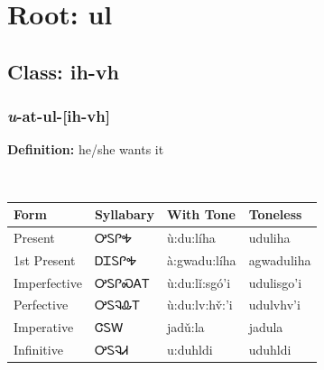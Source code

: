 \needspace{4in}
\section*{Root: ul}
\nopagebreak
{}
\needspace{3in}
\subsection*{Class: ih-vh}
\nopagebreak
\needspace{2in}
\subsubsection*{\textit{u}{-}at{-}\textbf{ul}{-}[ih-vh]}
\nopagebreak
\textbf{Definition: } he/she wants it
\\[0.5em]
\begin{tabularx}{\textwidth}{l X X X}%
\toprule%
\textbf{Form}&\textbf{Syllabary}&\textbf{With Tone}&\textbf{Toneless}\\%
\midrule%
Present&ᎤᏚᎵᎭ&ù:du:líha&uduliha\\%
1st Present&ᎠᏆᏚᎵᎭ&à:gwadu:líha&agwaduliha\\%
Imperfective&ᎤᏚᎵᏍᎪᎢ&ù:du:lǐ:sgó’i&udulisgo’i\\%
Perfective&ᎤᏚᎸᎲᎢ&ù:du:lv:hv̌:’i&udulvhv’i\\%
Imperative&ᏣᏚᎳ&jadǔ:la&jadula\\%
Infinitive&ᎤᏚᎸᏗ&u:duhldi&uduhldi\\%
\bottomrule%
\end{tabularx}
\\[1em]